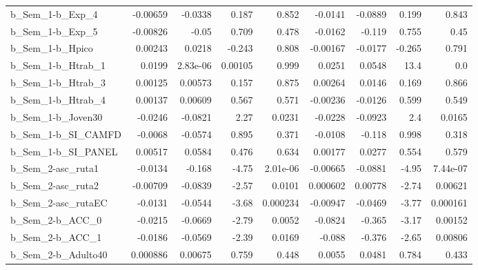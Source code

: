 \begin{tabular}{lrrrrrrrr}
b\_Sem\_1-b\_Exp\_4            &    -0.00659 &      -0.0338 &    0.187 &    0.852 &    -0.0141 &     -0.0889 &        0.199 &         0.843 \\
b\_Sem\_1-b\_Exp\_5            &    -0.00826 &        -0.05 &    0.709 &    0.478 &    -0.0162 &      -0.119 &        0.755 &          0.45 \\
b\_Sem\_1-b\_Hpico            &     0.00243 &       0.0218 &   -0.243 &    0.808 &   -0.00167 &     -0.0177 &       -0.265 &         0.791 \\
b\_Sem\_1-b\_Htrab\_1          &      0.0199 &     2.83e-06 &  0.00105 &    0.999 &     0.0251 &      0.0548 &         13.4 &           0.0 \\
b\_Sem\_1-b\_Htrab\_3          &     0.00125 &      0.00573 &    0.157 &    0.875 &    0.00264 &      0.0146 &        0.169 &         0.866 \\
b\_Sem\_1-b\_Htrab\_4          &     0.00137 &      0.00609 &    0.567 &    0.571 &   -0.00236 &     -0.0126 &        0.599 &         0.549 \\
b\_Sem\_1-b\_Joven30          &     -0.0246 &      -0.0821 &     2.27 &   0.0231 &    -0.0228 &     -0.0923 &          2.4 &        0.0165 \\
b\_Sem\_1-b\_SI\_CAMFD         &     -0.0068 &      -0.0574 &    0.895 &    0.371 &    -0.0108 &      -0.118 &        0.998 &         0.318 \\
b\_Sem\_1-b\_SI\_PANEL         &     0.00517 &       0.0584 &    0.476 &    0.634 &    0.00177 &      0.0277 &        0.554 &         0.579 \\
b\_Sem\_2-asc\_ruta1          &     -0.0134 &       -0.168 &    -4.75 & 2.01e-06 &   -0.00665 &     -0.0881 &        -4.95 &      7.44e-07 \\
b\_Sem\_2-asc\_ruta2          &    -0.00709 &      -0.0839 &    -2.57 &   0.0101 &   0.000602 &     0.00778 &        -2.74 &       0.00621 \\
b\_Sem\_2-asc\_rutaEC         &     -0.0131 &      -0.0544 &    -3.68 & 0.000234 &   -0.00947 &     -0.0469 &        -3.77 &      0.000161 \\
b\_Sem\_2-b\_ACC\_0            &     -0.0215 &      -0.0669 &    -2.79 &   0.0052 &    -0.0824 &      -0.365 &        -3.17 &       0.00152 \\
b\_Sem\_2-b\_ACC\_1            &     -0.0186 &      -0.0569 &    -2.39 &   0.0169 &     -0.088 &      -0.376 &        -2.65 &       0.00806 \\
b\_Sem\_2-b\_Adulto40         &    0.000886 &      0.00675 &    0.759 &    0.448 &     0.0055 &      0.0481 &        0.784 &         0.433 \\

\end{tabular}
